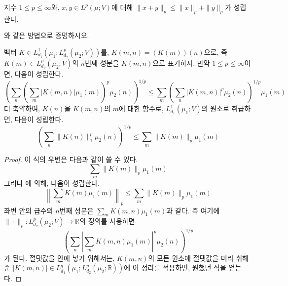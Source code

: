 \begin{theorem}[Minkowski, $L^p$]
\label{thm:lpminkowski}  
    지수 $1 \leq p \leq \infty$와, $x, y \in L^p(\mu; V)$에 대해 $\|x + y\|_p \leq \|x\|_p + \|y\|_p$가 성립한다.
\end{theorem}
\begin{exercise}
    와 같은 방법으로 증명하시오.
\end{exercise}

\begin{lemma}
\label{lem:genminkowski}
    벡터 $K \in L^1_{d_1}(\mu_1; L^p_{d_2}(\mu_2; V))$를, $K(m, n) = (K(m))(n)$으로, 즉 $K(m) \in L^p_{d_2}(\mu_2; V)$의 $n$번째 성분을 $K(m, n)$으로 표기하자.
    만약 $1 \leq p \leq \infty$이면, 다음이 성립한다.
    \begin{equation*}
        \left( \sum_n \left( \sum_m |K(m, n)| \mu_1(m) \right)^p \mu_2(n) \right)^{1/p} \leq \sum_m \left( \sum_n |K(m, n)|^p \mu_2(n)\right)^{1/p} \mu_1(m)
    \end{equation*}
    더 축약하여, $K(n)$을 $K(m, n)$의 $m$에 대한 함수로, $L^1_{d_1}(\mu_1; V)$의 원소로 취급하면, 다음이 성립한다.
    \begin{equation*}
        \left( \sum_n \|K(n)\|^p_1 \mu_2(n) \right)^{1/p} \leq \sum_m \|K(m)\|_p \mu_1(m)
    \end{equation*}
\end{lemma}
\begin{proof}
    이 식의 우변은 다음과 같이 쓸 수 있다.
    \begin{equation*}
        \sum_m \|K(m)\|_p \mu_1(m)
    \end{equation*}
    그러나 에 의해, 다음이 성립한다.
    \begin{equation*}
        \left\| \sum_m K(m) \mu_1(m) \right\|_p \leq \sum_m \|K(m)\|_p \mu_1(m)
    \end{equation*}
    좌변 안의 급수의 $n$번째 성분은 $\sum_m K(m, n) \mu_1(m)$과 같다.
    즉 여기에 $\|\cdot\|_p : L^p_{d_2}(\mu_2; V) \to \mathbb{R}$의 정의를 사용하면
    \begin{equation*}
        \left( \sum_n \left| \sum_m K(m, n) \mu_1(m) \right|^p \mu_2(n) \right)^{1/p}
    \end{equation*}
    가 된다.
    절댓값을 안에 넣기 위해서는, $K(m, n)$의 모든 원소에 절댓값을 미리 취해준 $|K(m, n)| \in L^q_{d_1}(\mu_1; L^p_{d_2}(\mu_2; \mathbb{R}))$에 이 정리를 적용하면, 원했던 식을 얻는다.
\end{proof}

